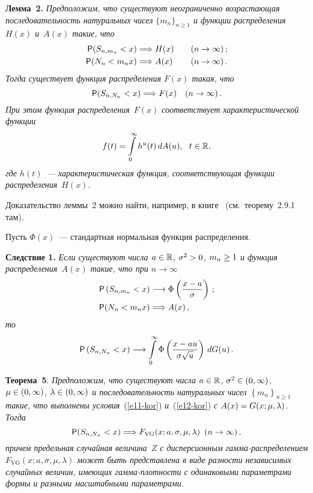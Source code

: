 \begin{multicols}{2}
\smallskip

\noindent
\textbf{Лемма~2.} \textit{Предположим, что существуют неограниченно
возрастающая последовательность натуральных чисел
$\{m_n\}_{n\ge1}$ и функции распределения~$H(x)$ и~$A(x)$ такие,
что}
\begin{align*}
{\sf P}(S_{n,m_n}<x)&\Longrightarrow H(x)\quad &  (n&\to\infty)\,;
\\
{\sf P}(N_n<m_nx)&\Longrightarrow A(x)\quad  &(n&\to\infty)\,.
\end{align*}
\textit{Тогда существует функция распределения $F(x)$ такая, что}
$$
{\sf P}(S_{n,N_n}<x)\Longrightarrow F(x)\quad  (n\to\infty)\,.
$$
\textit{При этом функция распределения~$F(x)$ соответствует
характеристической функции}
$$
f(t)=\int\limits_{0}^{\infty}h^u(t)\,dA(u),\ \ t\in\r,
$$
\textit{где $h(t)$~--- характеристическая функция, соответствующая функции
рас\-пре\-де\-ле\-ния}~$H(x)$.

\smallskip

Доказательство леммы~2 можно найти, например, в книге~\cite{KorolevBeningShorgin2011} 
(см.\ теорему~2.9.1 там).

Пусть $\Phi(x)$~--- стандартная нормальная функция распределения.

\smallskip

\noindent
\textbf{Следствие 1.} \textit{Если существуют числа $a\hm\in\r$,
$\sigma^2\hm>0$, $m_n\hm\ge1$ и функция распределения~$A(x)$ такие, что
при $n\to\infty$}
\begin{align}
{\sf P}\left(S_{n,m_n}<x\right)&\longrightarrow
\Phi\left(\displaystyle\frac{\displaystyle x-a\mathstrut}{\displaystyle \sigma\mathstrut}\right)\,;\label{e11-kor}
\\
{\sf P}(N_n<m_nx)&\Longrightarrow A(x)\,,\label{e12-kor}
\end{align}
\textit{то}
$$
{\sf
P}\left(S_{n,N_n}<x\right)\longrightarrow\int\limits_{0}^{\infty}\Phi
\left(\displaystyle\frac{\displaystyle x-au\mathstrut}{\displaystyle \sigma\sqrt{u}\mathstrut}\right)\,dG(u)\,.
$$


\smallskip

\noindent
\textbf{Теорема~5}. \textit{Предположим, что существуют числа $a \hm \in
\mathbb{R}$, $\sigma^{2}\hm \in (0, \infty )$, $\mu\hm\in(0,\infty)$,
$\lambda \hm\in (0, \infty )$ и последовательность натуральных чисел
$\left\{m_n \right\}_{n \geqslant 1}$ такие, что выполнены условия}~(\ref{e11-kor}) 
\textit{и}~(\ref{e12-kor}) \textit{с $A(x)\hm=G(x;\mu,\lambda)$. Тогда}
\begin{equation}
{\sf P}(S_{n, N_{n}}<x)\Longrightarrow
F_{\mathrm{VG}}(x;a,\sigma,\mu,\lambda) \enskip (n\rightarrow \infty)\,,\label{e13-kor}
\end{equation}
\textit{причем предельная случайная величина~$Z$ с дисперсионным
гам\-ма-рас\-пре\-де\-ле\-ни\-ем $F_{\mathrm{VG}}(x;a,\sigma,\mu,\lambda)$ может быть
представлена в виде разности независимых случайных величин, имеющих
гам\-ма-плот\-ности с одинаковыми параметрами формы и разными
масштабными параметрами.}


\end{multicols}
